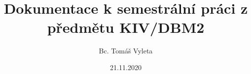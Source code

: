 \documentclass[a4, titlepage]{article}
\begin{document}
\title{Dokumentace k semestrální práci z předmětu KIV/DBM2}
\author{Bc. Tomáš Vyleta}
\date{21.11.2020}

\maketitle

\begin{figure}
\centering
{} 
\end{figure}
\end{document}
